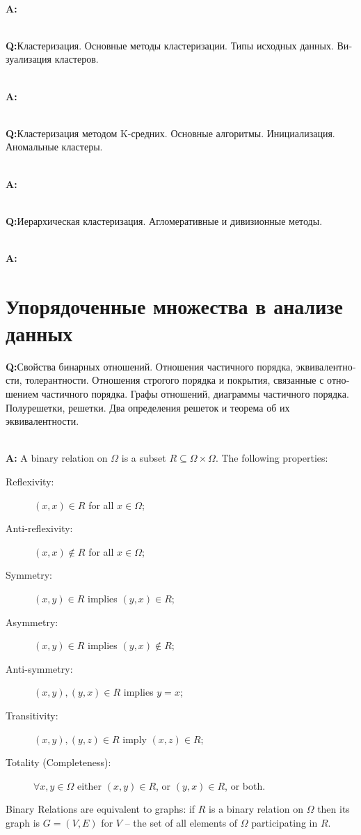 \documentclass[a4paper,14pt]{extarticle}
\newcommand{\rus}[1]{\foreignlanguage{russian}{#1}}
\begin{document}
\hfill\\\noindent\textbf{A:}

\hfill\\\noindent\textbf{Q:}\rus{Кластеризация. Основные методы кластеризации.
Типы исходных данных. Визуализация кластеров.}

\hfill\\\noindent\textbf{A:}

\hfill\\\noindent\textbf{Q:}\rus{Кластеризация методом K-средних. Основные алгоритмы.
Инициализация. Аномальные кластеры.}

\hfill\\\noindent\textbf{A:}

\hfill\\\noindent\textbf{Q:}\rus{Иерархическая кластеризация. Агломеративные и
дивизионные методы.}

\hfill\\\noindent\textbf{A:}



\section{\rus{Упорядоченные множества в анализе данных}} %
\label{sec:ordered_sets}

\noindent\textbf{Q:}\rus{Свойства бинарных отношений. Отношения частичного
порядка, эквивалентности, толерантности. Отношения строгого порядка и
покрытия, связанные с отношением частичного порядка. Графы отношений,
диаграммы частичного порядка. Полурешетки, решетки. Два определения решеток
и теорема об их эквивалентности.}

\hfill\\\noindent\textbf{A:}
A binary relation on $\Omega$ is a subset $R\subseteq \Omega\times \Omega$.
The following properties:
\begin{description}
    \item[Reflexivity:] $(x, x)\in R$ for all $x\in\Omega$;
    \item[Anti-reflexivity:] $(x, x)\notin R$ for all $x\in\Omega$;
    \item[Symmetry:] $(x, y)\in R$ implies $(y, x)\in R$;
    \item[Asymmetry:] $(x, y)\in R$ implies $(y, x)\notin R$;
    \item[Anti-symmetry:] $(x, y), (y,x)\in R$ implies $y=x$;
    \item[Transitivity:] $(x,y), (y,z)\in R$ imply $(x,z)\in R$;
    \item[Totality (Completeness):] $\forall x, y\in \Omega$ either $(x,y)\in R$,
    or $(y,x)\in R$, or both.
\end{description}
Binary Relations are equivalent to graphs: if $R$ is a binary relation on $\Omega$
then its graph is $G = (V, E)$ for $V$ -- the set of all elements of $\Omega$
participating in $R$.
\end{document}
